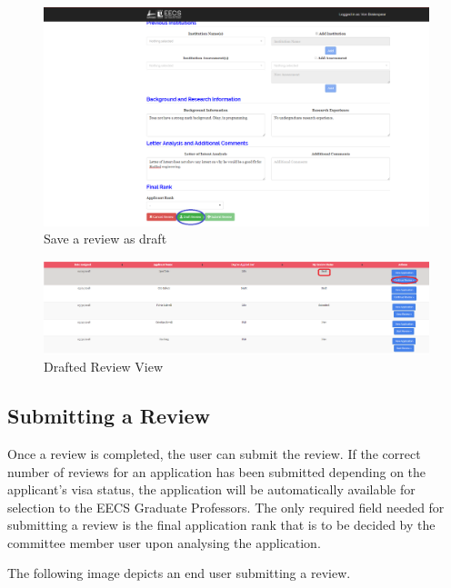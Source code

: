 \documentclass[fontsize=12pt,paper=letter,twoside]{scrartcl}
\begin{document}
\begin{figure}[!htb]
\begin{center}
\includegraphics[width=.9\textwidth]{images/save_as_draft_review.png}
\end{center}
\caption{Save a review as draft}
\label{fig:save_as_draft_review}
\end{figure}

\begin{figure}[!htb]
\begin{center}
\includegraphics[width=.9\textwidth]{images/drafted_review.png}
\end{center}
\caption{Drafted Review View}
\label{fig:drafted_review}
\end{figure}

\subsection{Submitting a Review}
Once a review is completed, the user can submit the review. If the correct number of reviews for an application has been submitted depending on the applicant's visa status, the application will be automatically available for selection to the EECS Graduate Professors. The only required field needed for submitting a review is the final application rank that is to be decided by the committee member user upon analysing the application.

\bigskip
\noindent The following image depicts an end user submitting a review. 
\end{document}
